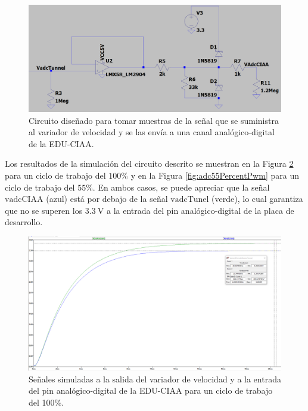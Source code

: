 \begin{figure}[H]
    \centering
    \includegraphics[width=1.1\linewidth]{Figuras/datalogger/Hardware/adcCiaaCircuitSimulate.png}
    \caption{Circuito diseñado para tomar muestras de la señal que se suministra al variador de velocidad y se las envía a una canal analógico-digital de la EDU-CIAA.}
    \label{fig:adcCiaaCircuitSimulate}
\end{figure}
Los resultados de la simulación del circuito descrito se muestran en la Figura \ref{fig:adc100PercentPwm} para un ciclo de trabajo del $100\%$ y en la Figura \ref{fig:adc55PercentPwm} para un ciclo de trabajo del $55\%$. En ambos casos, se puede apreciar que la señal $\text{vadcCIAA}$ (azul) está por debajo de la señal $\text{vadcTunel}$ (verde), lo cual garantiza que no se superen los $\SI{3.3}{\volt}$ a la entrada del pin analógico-digital de la placa de desarrollo.


\begin{figure}[H]
    \centering
    \includegraphics[width=1.1\linewidth]{Figuras/datalogger/Hardware/adc100PercentPwm.png}
    \caption{Señales simuladas a la salida del variador de velocidad y a la entrada del pin analógico-digital de la EDU-CIAA para un ciclo de trabajo del 100\%.}
    \label{fig:adc100PercentPwm}
\end{figure}

